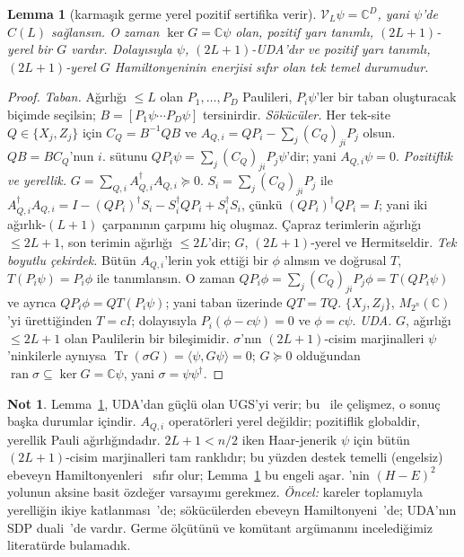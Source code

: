 \documentclass[aps,pra,onecolumn,superscriptaddress,nofootinbib,longbibliography,10pt]{revtex4-2}
\newtheorem{lemma}{Lemma}
\theoremstyle{definition}
\newtheorem{remark}[proposition]{Not}
\newcommand{\CC}{\mathbb C}
\newcommand{\Tr}{\operatorname{Tr}}
\begin{document}
\begin{lemma}[karmaşık germe yerel pozitif sertifika verir]\label{lem:1}
$\mathcal V_L\psi=\CC^D$, yani $\psi$'de $C(L)$ sağlansın. O zaman $\ker G=\CC\psi$ olan, pozitif yarı tanımlı, $(2L+1)$-yerel bir $G$ vardır. Dolayısıyla $\psi$, $(2L+1)$-UDA'dır ve pozitif yarı tanımlı, $(2L+1)$-yerel $G$ Hamiltonyeninin enerjisi sıfır olan tek temel durumudur.
\end{lemma}
\begin{proof}
\emph{Taban.} Ağırlığı $\le L$ olan $P_1,\dots,P_D$ Paulileri, $P_i\psi$'ler bir taban oluşturacak biçimde seçilsin; $B=[P_1\psi\cdots P_D\psi]$ tersinirdir.
\emph{Sökücüler.} Her tek-site $Q\in\{X_j,Z_j\}$ için $C_Q=B^{-1}QB$ ve $A_{Q,i}=QP_i-\sum_j(C_Q)_{ji}P_j$ olsun. $QB=BC_Q$'nun $i$. sütunu $QP_i\psi=\sum_j(C_Q)_{ji}P_j\psi$'dir; yani $A_{Q,i}\psi=0$.
\emph{Pozitiflik ve yerellik.} $G=\sum_{Q,i}A_{Q,i}^\dagger A_{Q,i}\succeq0$. $S_i=\sum_j(C_Q)_{ji}P_j$ ile
$A_{Q,i}^\dagger A_{Q,i}=I-(QP_i)^\dagger S_i-S_i^\dagger QP_i+S_i^\dagger S_i$, çünkü $(QP_i)^\dagger QP_i=I$; yani iki ağırlık-$(L+1)$ çarpanının çarpımı hiç oluşmaz. Çapraz terimlerin ağırlığı $\le2L+1$, son terimin ağırlığı $\le2L$'dir; $G$, $(2L+1)$-yerel ve Hermitseldir.
\emph{Tek boyutlu çekirdek.} Bütün $A_{Q,i}$'lerin yok ettiği bir $\phi$ alınsın ve doğrusal $T$, $T(P_i\psi)=P_i\phi$ ile tanımlansın. O zaman $QP_i\phi=\sum_j(C_Q)_{ji}P_j\phi=T(QP_i\psi)$ ve ayrıca $QP_i\phi=QT(P_i\psi)$; yani taban üzerinde $QT=TQ$. $\{X_j,Z_j\}$, $M_{2^n}(\CC)$'yi ürettiğinden $T=cI$; dolayısıyla $P_i(\phi-c\psi)=0$ ve $\phi=c\psi$.
\emph{UDA.} $G$, ağırlığı $\le2L+1$ olan Paulilerin bir bileşimidir. $\sigma$'nın $(2L+1)$-cisim marjinalleri $\psi$'ninkilerle aynıysa $\Tr(\sigma G)=\langle\psi,G\psi\rangle=0$; $G\succeq0$ olduğundan $\operatorname{ran}\sigma\subseteq\ker G=\CC\psi$, yani $\sigma=\psi\psi^\dagger$.
\end{proof}
\begin{remark}
Lemma~\ref{lem:1}, UDA'dan güçlü olan UGS'yi verir; bu~\cite{KJTV19} ile çelişmez, o sonuç başka durumlar içindir. $A_{Q,i}$ operatörleri yerel değildir; pozitiflik globaldir, yerellik Pauli ağırlığındadır. $2L+1<n/2$ iken Haar-jenerik $\psi$ için bütün $(2L+1)$-cisim marjinalleri tam ranklıdır; bu yüzden destek temelli (engelsiz) ebeveyn Hamiltonyenleri~\cite{KJTV17} sıfır olur; Lemma~\ref{lem:1} bu engeli aşar. \cite{CJWZ12}'nin $(H-E)^2$ yolunun aksine basit özdeğer varsayımı gerekmez. \emph{Öncel:} kareler toplamıyla yerelliğin ikiye katlanması~\cite{CJWZ12}'de; sökücülerden ebeveyn Hamiltonyeni~\cite{GST18}'de; UDA'nın SDP duali~\cite{HG16,KJTV19,Wyd20}'de vardır. Germe ölçütünü ve komütant argümanını incelediğimiz literatürde bulamadık.
\end{remark}
\end{document}
